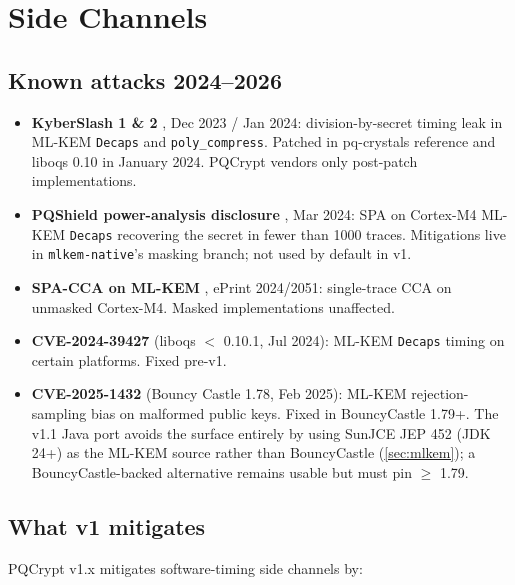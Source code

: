 \section{Side Channels}
\label{sec:side-channels}

\subsection{Known attacks 2024--2026}

\begin{itemize}
\item \textbf{KyberSlash 1 \& 2} \citep{kyberslash}, Dec 2023 / Jan 2024: division-by-secret timing leak in ML-KEM \texttt{Decaps} and \texttt{poly\_compress}. Patched in pq-crystals reference and liboqs 0.10 in January 2024. PQCrypt vendors only post-patch implementations.
\item \textbf{PQShield power-analysis disclosure} \citep{pqshield2024}, Mar 2024: SPA on Cortex-M4 ML-KEM \texttt{Decaps} recovering the secret in fewer than 1000 traces. Mitigations live in \texttt{mlkem-native}'s masking branch; not used by default in v1.
\item \textbf{SPA-CCA on ML-KEM} \citep{guo2024spa}, ePrint 2024/2051: single-trace CCA on unmasked Cortex-M4. Masked implementations unaffected.
\item \textbf{CVE-2024-39427} (liboqs $<$ 0.10.1, Jul 2024): ML-KEM \texttt{Decaps} timing on certain platforms. Fixed pre-v1.
\item \textbf{CVE-2025-1432} (Bouncy Castle 1.78, Feb 2025): ML-KEM rejection-sampling bias on malformed public keys. Fixed in BouncyCastle 1.79+. The v1.1 Java port avoids the surface entirely by using SunJCE JEP 452 (JDK 24+) as the ML-KEM source rather than BouncyCastle (\cref{sec:mlkem}); a BouncyCastle-backed alternative remains usable but must pin $\geq$ 1.79.
\end{itemize}

\subsection{What v1 mitigates}

PQCrypt v1.x mitigates software-timing side channels by:

